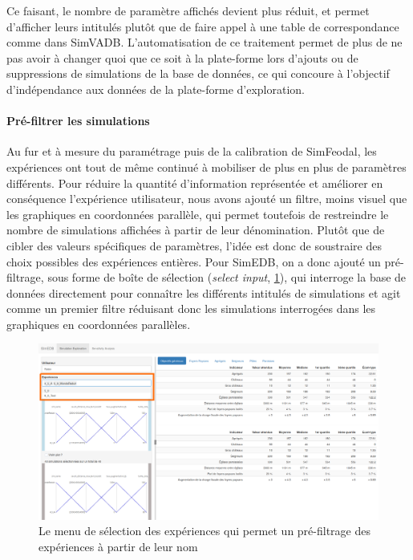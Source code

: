 Ce faisant, le nombre de  paramètre affichés devient plus réduit, et permet d'afficher leurs intitulés plutôt que de faire appel à une table de correspondance comme dans SimVADB.
L'automatisation de ce traitement permet de plus de ne pas avoir à changer quoi que ce soit à la plate-forme lors d'ajouts ou de suppressions de simulations de la base de données, ce qui concoure à l'objectif d'indépendance aux données de la plate-forme d'exploration.

\paragraph*{Pré-filtrer les simulations}

Au fur et à mesure du paramétrage puis de la calibration de SimFeodal, les expériences ont tout de même continué à mobiliser de plus en plus de paramètres différents.
Pour réduire la quantité d'information représentée et améliorer en conséquence \og l'expérience utilisateur\fg{}, nous avons ajouté un filtre, moins visuel que les graphiques en coordonnées parallèle, qui permet toutefois de restreindre le nombre de simulations affichées à partir de leur dénomination.
Plutôt que de cibler des valeurs spécifiques de paramètres, l'idée est donc de soustraire des choix possibles des expériences entières.
Pour SimEDB, on a donc ajouté un pré-filtrage, sous forme de \og boîte de sélection\fg{} (\textit{select input}, \cref{fig:simedb-prefilter}), qui interroge la base de données directement pour connaître les différents intitulés de simulations et agit comme un premier filtre réduisant donc les simulations interrogées dans les graphiques en coordonnées parallèles.

\begin{figure}[H]
\centering
\includegraphics[width=\linewidth]{img/SimEDB_prefiltrage.png}
\caption{Le menu de sélection des expériences qui permet un pré-filtrage des expériences à partir de leur nom}
\label{fig:simedb-prefilter}
\end{figure}

